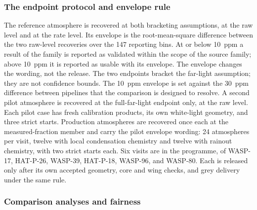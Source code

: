 \subsubsection{The endpoint protocol and envelope rule}


The reference atmosphere is recovered at both bracketing assumptions, at
the raw level and at the rate level. Its envelope is the root-mean-square
difference between the two raw-level recoveries over the 147 reporting
bins. At or below 10~ppm a result of the family is reported as validated
within the scope of the source family; above 10~ppm it is reported as
usable with its envelope. The envelope changes the wording, not the
release. The two endpoints bracket the far-light assumption; they are
not confidence bounds. The 10~ppm envelope is set against the 30~ppm
difference between pipelines that the comparison is designed to resolve.
A second pilot atmosphere is recovered at the full-far-light endpoint
only, at the raw level. Each pilot case has fresh calibration products,
its own white-light geometry, and three strict starts. Production
atmospheres are recovered once each at the measured-fraction member and
carry the pilot envelope wording: 24 atmospheres per visit, twelve with
local condensation chemistry and twelve with rainout chemistry, with two
strict starts each. Six visits are in the programme, of WASP-17,
HAT-P-26, WASP-39, HAT-P-18, WASP-96, and WASP-80. Each is released only
after its own accepted geometry, core and wing checks, and grey delivery
under the same rule.

\subsubsection{Comparison analyses and fairness}


